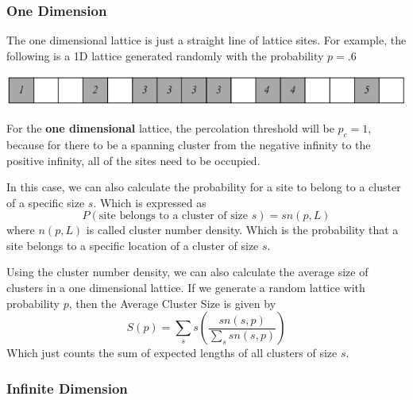 \documentclass[compress]{beamer}
\newcommand{\imp}[1]{\textcolor{NordRed}{#1}}
\begin{document}
\subsubsection{One Dimension}
\begin{frame}
    The one dimensional lattice is just a straight line of lattice sites. For example, the
    following is a 1D lattice generated randomly with the probability \(p=.6\)

    \begin{center}
        \includegraphics[width=\linewidth]{1dlattice.png}
    \end{center}

    For the \textbf{one dimensional} lattice, the percolation threshold will be \(p_c =
    1\), because for there to be a spanning cluster from the negative infinity to the
    positive infinity, all of the sites need to be occupied.

\end{frame}

\begin{frame}
    In this case, we can also calculate the probability for a site to belong to a cluster
    of a specific size \(s\). Which is expressed as 
    \[P\left(\text{site belongs to a cluster of size } s\right)= s n(p, L)\] 
    where \(n(p, L)\) is called \imp{cluster number density}. Which is the probability
    that a site belongs to a specific location of a cluster of size \(s\).
\end{frame}

\begin{frame}
    Using the cluster number density, we can also calculate the average size of clusters
    in a one dimensional lattice. If we generate a random lattice with probability \(p\),
    then the \imp{Average Cluster Size} is given by 
    \[S(p) = \sum^{}_{s}s\left(\frac{sn(s, p)}{\sum^{}_{s} sn(s, p)}\right) \] 
    Which just counts the sum of expected lengths of all clusters of size \(s\).
\end{frame}

\subsubsection{Infinite Dimension}
\end{document}
